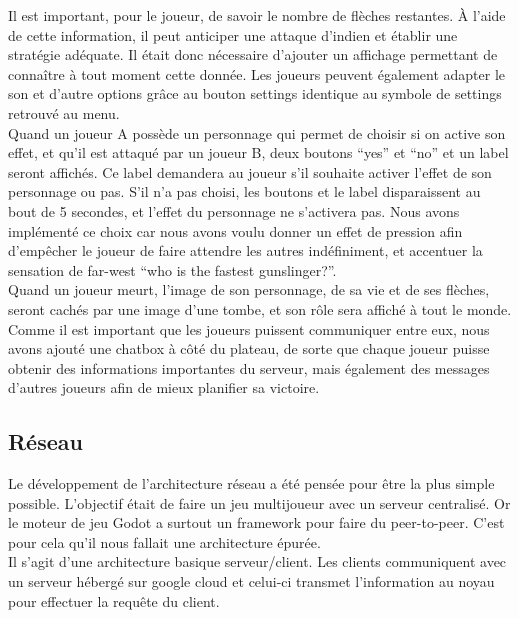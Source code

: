 \documentclass[a4paper,11pt]{article}
\begin{document}
Il est important, pour le joueur, de savoir le nombre de flèches restantes. À l’aide de cette information, il peut anticiper une attaque d’indien et établir une stratégie adéquate.  Il était donc nécessaire d’ajouter un affichage permettant de connaître à tout moment cette donnée.
 Les joueurs peuvent également adapter le son et d'autre options grâce au bouton settings identique au symbole de settings retrouvé au menu. \\
 
Quand un joueur A possède un personnage qui permet de choisir si on active son effet, et qu’il est attaqué par un joueur B, deux boutons “yes” et “no” et un label seront affichés. Ce label demandera au joueur s'il souhaite activer l’effet de son personnage ou pas. S’il n’a pas choisi, les boutons et le label disparaissent au bout de 5 secondes, et l’effet du personnage ne s’activera pas. 
Nous avons implémenté ce choix car nous avons voulu donner un effet de pression afin d'empêcher le joueur de faire attendre les autres indéfiniment, et accentuer la sensation de far-west “who is the fastest gunslinger?”. \\

Quand un joueur meurt, l’image de son personnage, de sa vie et de ses flèches, seront cachés par une image d’une tombe, et son rôle sera affiché à tout le monde. \\

Comme il est important que les joueurs puissent communiquer entre eux, nous avons ajouté une chatbox à côté du plateau, de sorte que chaque joueur puisse obtenir des informations importantes du serveur, mais également des messages d’autres joueurs afin de mieux planifier sa victoire.


\subsection{Réseau}

Le développement de l'architecture réseau a été pensée pour être la plus simple possible. L’objectif était de faire un jeu multijoueur avec un serveur centralisé. Or le moteur de jeu Godot a surtout un framework pour faire du peer-to-peer. C’est pour cela qu’il nous fallait une architecture épurée.  \\

Il s’agit d’une architecture basique serveur/client. Les clients communiquent avec un serveur hébergé sur google cloud et celui-ci transmet l’information au noyau pour effectuer la requête du client. \\
\end{document}
